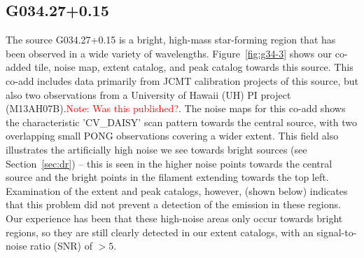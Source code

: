 \documentclass[twocolumn,times]{aastex6}
\newcommand{\note}[1]{\textcolor{red}{Note: #1}}
\begin{document}
\subsection{G034.27+0.15}
The source G034.27+0.15 is a bright, high-mass star-forming region
that has been observed in a wide variety of
wavelengths. Figure~\ref{fig:g34-3} shows our co-added tile, noise map,
extent catalog, and peak catalog towards this source. This co-add
includes data primarily from JCMT calibration projects of this source,
but also two observations from a University of Hawaii (UH) PI project
(M13AH07B).\note{Was this published?}. The noise maps for this co-add
shows the characteristic 'CV\_DAISY' scan pattern towards the central
source, with two overlapping small PONG observations covering a wider
extent. This field also illustrates the artificially high noise we
see towards bright sources (see Section~\ref{sec:dr}) -- this is seen
in the higher noise points towards the central source and the bright
points in the filament extending towards the top left. Examination of
the extent and peak catalogs, however, (shown below) indicates that
this problem did not prevent a detection of the emission in these
regions. Our experience has been that these high-noise areas only
occur towards bright regions, so they are still clearly detected in
our extent catalogs, with an signal-to-noise ratio (SNR) of $>5$.



\end{document}
